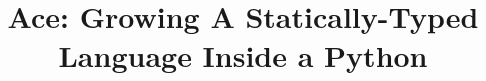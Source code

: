 \documentclass[10pt,preprint]{sigplanconf}
\begin{document}
\conferenceinfo{-}{-} 
\copyrightyear{-} 
\copyrightdata{[to be supplied]} 


\newcommand{\Ace}{\textsf{Ace}}

\title{\Ace: Growing A Statically-Typed Language Inside a Python}

\authorinfo{~}{~}{~}

\maketitle
\end{document}
